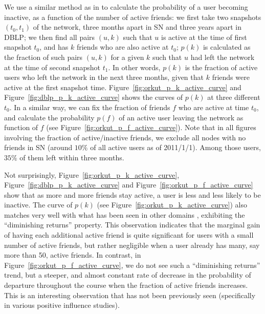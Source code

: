 \documentclass[phd,tocprelim]{cornell}
\begin{document}
We use a similar method as in \cite{Backstrom:2006} to calculate the probability of a user becoming inactive, as a function of the number of active friends: we first take two snapshots $(t_0, t_1)$ of the network, three months apart in SN and three years apart in DBLP; we then find all pairs $(u,k)$ such that $u$ is active at the time of first snapshot $t_0$, and has $k$ friends who are also active at $t_0$; $p(k)$ is calculated as the fraction of such pairs $(u,k)$ for a given $k$ such that $u$ had left the network at the time of second snapshot $t_1$. In other words, $p(k)$ is the fraction of active users who left the network in the next three months, given that $k$ friends were active at the first snapshot time. Figure~\ref{fig:orkut_p_k_active_curve} and Figure~\ref{fig:dblp_p_k_active_curve} shows the curves of $p(k)$ at three different $t_0$. In a similar way, we can fix the fraction of friends $f$ who are active at time $t_0$, and calculate the probability $p(f)$ of an active user leaving the network as function of $f$ (see Figure~\ref{fig:orkut_p_f_active_curve}). Note that in all figures involving the fraction of active/inactive friends, we exclude all nodes with no friends in SN (around $10\%$ of all active users as of 2011/1/1). Among those users, $35\%$ of them left within three months.

Not surprisingly, Figure~\ref{fig:orkut_p_k_active_curve}, Figure~\ref{fig:dblp_p_k_active_curve} and Figure~\ref{fig:orkut_p_f_active_curve} show that as more and more friends stay active, a user is less and less likely to be inactive. The curve of $p(k)$ (see Figure~\ref{fig:orkut_p_k_active_curve}) also matches very well with what has been seen in other domains \cite{Backstrom:2006}, exhibiting the ``diminishing returns'' property.
This observation indicates that the marginal gain of having each additional active friend is quite significant for users with a small number of active friends, but rather negligible when a user already has many, say more than 50,  active friends. In contrast, in Figure~\ref{fig:orkut_p_f_active_curve}, we do not see such a ``diminishing returns'' trend, but a steeper, and almost constant rate of decrease in the probability of departure throughout the course when the fraction of active friends increases. This is an interesting observation that has not been previously seen (specifically in various positive influence studies). 
\end{document}
